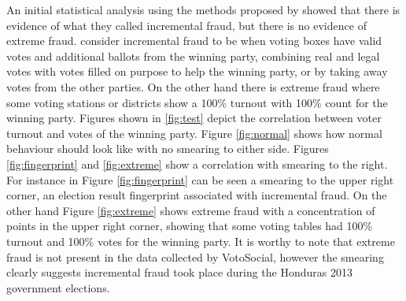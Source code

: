 \documentclass[letterpaper,10pt]{article}
\begin{document}
An initial statistical analysis using the methods proposed by \cite{klimek2012} showed that there is evidence of what they called incremental fraud, but there is no evidence of extreme fraud. \cite{klimek2012} consider incremental fraud to be when voting boxes have valid votes and additional ballots from the winning party, combining real and legal votes with votes filled on purpose to help the winning party, or by taking away votes from the other parties. On the other hand there is extreme fraud where some voting stations or districts show a 100\% turnout with 100\% count for the winning party. Figures shown in \ref{fig:test} depict the correlation between voter turnout and votes of the winning party. Figure \ref{fig:normal} shows how normal behaviour should look like with no smearing to either side. Figures \ref{fig:fingerprint} and \ref{fig:extreme} show a correlation with smearing to the right. For instance in Figure \ref{fig:fingerprint} can be seen a smearing to the upper right corner, an election result fingerprint associated with incremental fraud. On the other hand Figure \ref{fig:extreme} shows extreme fraud with a concentration of points in the upper right corner, showing that some voting tables had 100\% turnout and 100\% votes for the winning party. It is worthy to note that extreme fraud is not present in the data collected by VotoSocial, however the smearing clearly suggests incremental fraud took place during the Honduras 2013 government elections.

\end{document}
